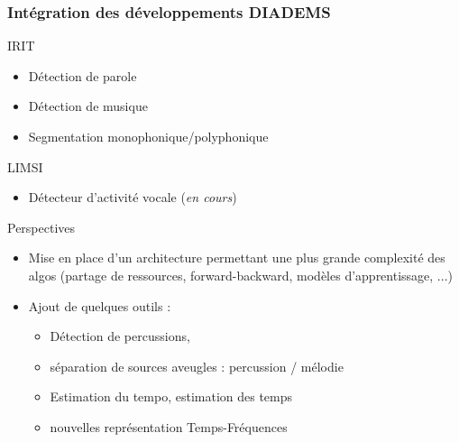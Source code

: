 \documentclass[10pt, final, hyperref, table]{beamer}
\begin{document}
\begin{frame}
  \frametitle{Intégration des développements DIADEMS}
  \begin{block}{IRIT}
    \begin{itemize}
    \item Détection de parole
    \item Détection de musique 
    \item Segmentation monophonique/polyphonique 
    \end{itemize}
  \end{block}
  \begin{block}{LIMSI}
    \begin{itemize}
    \item Détecteur d'activité vocale (\emph{en cours})
    \end{itemize}
  \end{block}
  \begin{block}{Perspectives}
    \begin{itemize}
    \item Mise en place d'un architecture permettant une plus grande complexité des algos (partage de ressources, forward-backward, modèles d'apprentissage, ...)
    \item Ajout de quelques outils :
      \begin{itemize}
      \item Détection de percussions,
      \item séparation de sources aveugles : percussion / mélodie
      \item Estimation du tempo, estimation des temps
      \item nouvelles représentation Temps-Fréquences 
      \end{itemize}

    \end{itemize}
    
  \end{block}
\end{frame}
\end{document}
